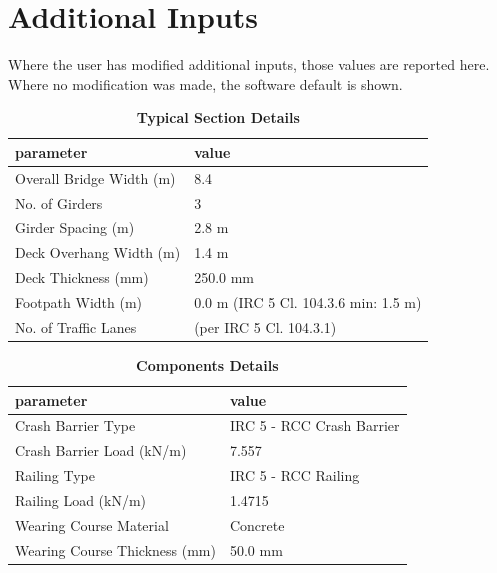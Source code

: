\documentclass[12pt,a4paper]{report}
\numberwithin{table}{chapter}
\numberwithin{figure}{chapter}
\begin{document}
\newpage
\section{Additional Inputs}
\label{sec:additional-inputs}

Where the user has modified additional inputs, those values are reported here. Where no modification was made, the software default is shown.

\vspace{0.8cm}

\begin{longtable}{|L{5.5cm}|p{10.0cm}|}
\caption{\textbf{Typical Section Details}}
\\
\hline
\textbf{parameter} & \textbf{value} \\
\hline
\textnormal{Overall Bridge Width (m)} & 8.4 \\[6pt]
\hline
\textnormal{No. of Girders} & 3 \\[6pt]
\hline
\textnormal{Girder Spacing (m)} & 2.8 m \\[6pt]
\hline
\textnormal{Deck Overhang Width (m)} & 1.4 m \\[6pt]
\hline
\textnormal{Deck Thickness (mm)} & 250.0 mm \\[6pt]
\hline
\textnormal{Footpath Width (m)} & 0.0 m (IRC 5 Cl. 104.3.6 min: 1.5 m) \\[6pt]
\hline
\textnormal{No. of Traffic Lanes} &  (per IRC 5 Cl. 104.3.1) \\[6pt]
\hline
\end{longtable}

\vspace{0.8em}

\begin{longtable}{|L{5.5cm}|p{10.0cm}|}
\caption{\textbf{Components Details}}
\\
\hline
\textbf{parameter} & \textbf{value} \\
\hline
\textnormal{Crash Barrier Type} & IRC 5 - RCC Crash Barrier \\[6pt]
\hline
\textnormal{Crash Barrier Load (kN/m)} & 7.557 \\[6pt]
\hline

\textnormal{Railing Type} & IRC 5 - RCC Railing \\[6pt]
\hline
\textnormal{Railing Load (kN/m)} & 1.4715 \\[6pt]
\hline
\textnormal{Wearing Course Material} & Concrete \\[6pt]
\hline
\textnormal{Wearing Course Thickness (mm)} & 50.0 mm \\[6pt]
\hline
\end{longtable}
\end{document}
